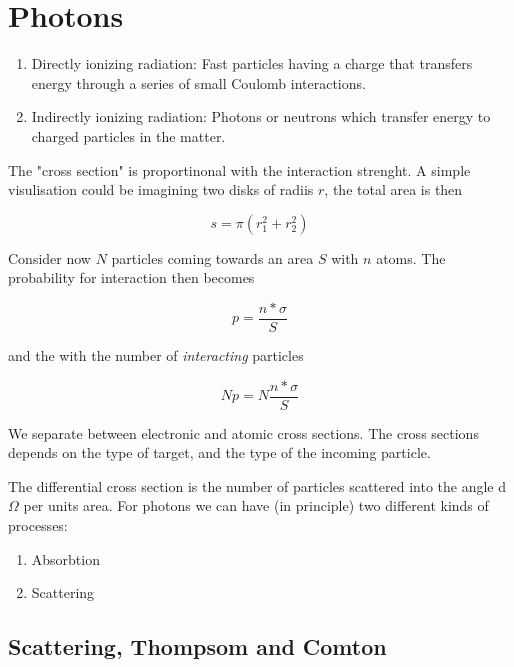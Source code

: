 \documentclass{article}
\begin{document}
\section{Photons}

\begin{enumerate}
    
    \item
	Directly ionizing radiation: Fast particles having a charge that transfers energy through a series of small Coulomb interactions.
    \item
	Indirectly ionizing radiation: Photons or neutrons which transfer energy to charged particles in the matter.

\end{enumerate}

The "cross section" is proportinonal with the interaction strenght.
A simple visulisation could be imagining two disks of radiis $r$, the total area is then 

\begin{equation}
    s = \pi (r_1^2 + r_2^2)
\end{equation}

Consider now $N$ particles coming towards an area $S$ with $n$ atoms.
The probability for interaction then becomes 

\begin{equation}
    p = \frac{n*\sigma}{S}
\end{equation}

and the with the number of \emph{interacting} particles

\begin{equation}
    Np = N\frac{n*\sigma}{S}
\end{equation}

We separate between electronic and atomic cross sections.
The cross sections depends on the type of target, and the type of the incoming particle.

The differential cross section is the number of particles scattered into the angle d$\Omega$ per units area.
For photons we can have (in principle) two different kinds of processes:

\begin{enumerate}

    \item
	Absorbtion
    \item
	Scattering
\end{enumerate}

\subsection{Scattering, Thompsom and Comton}
\end{document}
